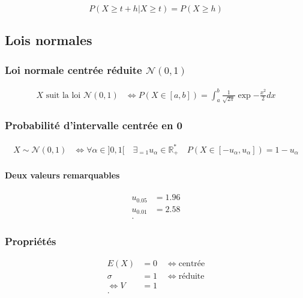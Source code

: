 \documentclass{article}
\newcommand{\R}{\mathds{R}}
\begin{document}
\[P(X \geq t+h | X \geq t) = P(X \geq h)\]                    

\subsection{Lois normales}

\subsubsection{Loi normale centrée réduite $\mathcal{N}(0, 1)$}

\begin{equation*}
    \begin{split}
        \text{$X$ suit la loi $\mathcal{N}(0, 1)$} &\iff P(X \in [a, b]) = \int_a^b \frac{1}{\sqrt{2\pi}} \exp{-\frac{x^2}{2}} dx
    \end{split}
\end{equation*}

\subsubsection{Probabilité d'intervalle centrée en 0}

\begin{equation*}
    \begin{split}
        X \sim \mathcal{N}(0, 1) &\iff \forall \alpha \in ]0, 1[ \quad \exists_{=1} u_\alpha \in \R_+^\ast \quad P(X \in [-u_\alpha, u_\alpha]) = 1 - u_\alpha
    \end{split}
\end{equation*}

\paragraph{Deux valeurs remarquables}

\begin{align*}
	u_{0.05} &= 1.96 \\
	u_{0.01} &= 2.58 \\
.\end{align*}

\subsubsection{Propriétés}

\begin{align*}
	E(X) &= 0 \quad\iff\text{centrée}\\
	\sigma &= 1 \quad\iff\text{réduite}\\
	\iff V &= 1 \\
.\end{align*}
\end{document}
